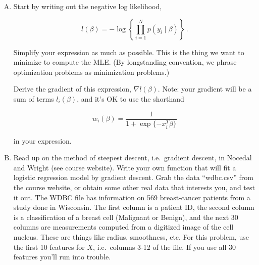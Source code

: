 \documentclass{article}
\begin{document}
\begin{enumerate}[(A)]



\item Start by writing out the negative log likelihood,



$$

l(\beta) = - \log \left \{ \prod_{i=1}^N p(y_i \mid \beta) \right \} \, .

$$



Simplify your expression as much as possible. This is the thing we want to minimize to compute the MLE.  (By longstanding convention, we phrase optimization problems as minimization problems.)







Derive the gradient of this expression, $\nabla l(\beta)$.   Note: your gradient will be a sum of terms $l_i(\beta)$, and it's OK to use the shorthand



$$

w_i(\beta) =  \frac{1}{1 + \exp\{-x_i^T \beta\}}

$$



in your expression.











\item Read up on the method of steepest descent, i.e.~gradient descent, in Nocedal and Wright (see course website).  Write your own function that will fit a logistic regression model by gradient descent.  Grab the data ``wdbc.csv'' from the course website, or obtain some other real data that interests you, and test it out.  The WDBC file has information on 569 breast-cancer patients from a study done in Wisconsin.  The first column is a patient ID, the second column is a classification of a breast cell (Malignant or Benign), and the next 30 columns are measurements computed from a digitized image of the cell nucleus.  These are things like radius, smoothness, etc.  For this problem, use the first 10 features for $X$, i.e.~columns 3-12 of the file.  If you use all 30 features you'll run into trouble.








\end{enumerate}
\end{document}
